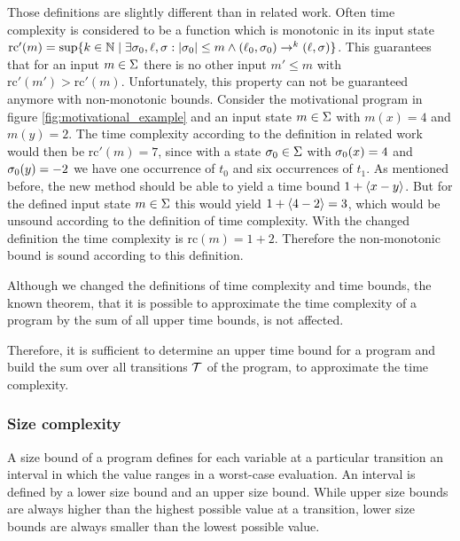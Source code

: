 Those definitions are slightly different than in related work. 
Often time complexity is considered to be a function which is monotonic in its input state $\text{rc}'(m) = \sup \lbrace  k \in \mathbb{N} \mid \exists \sigma_0, \ell, \sigma: \left|\sigma_0\right| \leq m \wedge (\ell_0, \sigma_0) \rightarrow^k (\ell, \sigma)  \rbrace$.
This guarantees that for an input $m \in \Sigma$ there is no other input $m' \leq m$ with $\text{rc}'(m') > \text{rc}'(m)$.
Unfortunately, this property can not be guaranteed anymore with non-monotonic bounds.
Consider the motivational program in figure \ref{fig:motivational_example} and an input state $m \in \Sigma$ with $m(x) = 4$ and $m(y) = 2$.
The time complexity according to the definition in related work would then be $\text{rc}'(m) = 7$, since with a state $\sigma_0 \in \Sigma$ with $\sigma_0(x) = 4$ and $\sigma_0(y) = -2$ we have one occurrence of $t_0$ and six occurrences of $t_1$.
As mentioned before, the new method should be able to yield a time bound $1 + \langle x-y\rangle$.
But for the defined input state $m \in \Sigma$ this would yield $1 + \langle4-2\rangle = 3$, which would be unsound according to the definition of time complexity.
With the changed definition the time complexity is $\text{rc}(m) = 1 + 2$.
Therefore the non-monotonic bound is sound according to this definition.

Although we changed the definitions of time complexity and time bounds, the known theorem, that it is possible to approximate the time complexity of a program by the sum of all upper time bounds, is not affected.



Therefore, it is sufficient to determine an upper time bound for a program and build the sum over all transitions $\mathcal{T}$ of the program, to approximate the time complexity. 

\subsubsection{Size complexity}

A size bound of a program defines for each variable at a particular transition an interval in which the value ranges in a worst-case evaluation.
An interval is defined by a lower size bound and an upper size bound.
While upper size bounds are always higher than the highest possible value at a transition, lower size bounds are always smaller than the lowest possible value.

